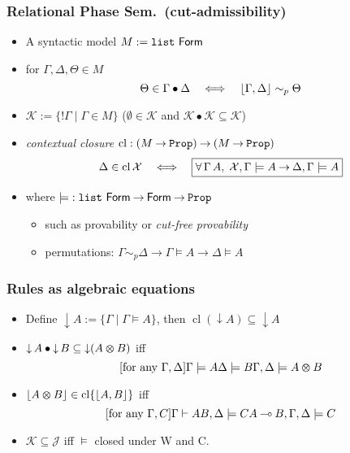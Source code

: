 \documentclass[xcolor=pdftex,graphicx=pdftex,12pt]{beamer}
\renewcommand\frule[1]{\ensuremath{\langle#1\rangle}}
\newcommand{\coq}[1]{\ensuremath{\mathalpha{\mathtt{#1}}}}
\newcommand{\cfun}{\mathbin{\rightarrow}}
\newcommand{\Prop}{\coq{Prop}}
\newcommand{\cdef}{\mathrel{\mathtt{:=}}}
\renewcommand{\iff}{\mathrel\Longleftrightarrow}
\newcommand{\seq}{\mathrel\vdash}
\newcommand{\ltime}{\mathbin{\varotimes}}
\newcommand{\limp}{\mathbin{\multimap}}
\newcommand{\lbang}{\mathop{!}}
\newcommand{\cperm}{\mathrel{\sim_p}}
\newcommand{\cl}{\mathop{\mathrm{cl}}}
\newcommand{\mmult}{\mathbin{\bullet}}
\newcommand{\set}[1]{\mathcal{#1}}
\newcommand{\pable}{\mathrel{\models}}
\begin{document}
\begin{frame}

\frametitle{Relational Phase Sem.\ (cut-admissibility)}


\begin{itemize}
\item A syntactic model  $M\cdef \coq{list}~\mathsf{Form}$
\item for $\Gamma,\Delta,\Theta\in M$
$$\Theta\in \Gamma\mmult \Delta \quad\iff\quad\ulist{\Gamma,\Delta}\cperm\Theta$$
\item $\set K\cdef \{\lbang\Gamma\mid\Gamma\in M\}$ ($\emptyset\in\set K$ and $\set K\mmult\set K\subseteq\set K$)
\item \emph{contextual closure}  $\cl: (M\cfun\Prop)\cfun (M\cfun\Prop)$ 
$$\Delta\in\cl\set X\quad\iff\quad \fbox{$\forall\,\Gamma\,A,\;\set X,\Gamma\pable A\cfun \Delta,\Gamma\pable A$}$$ 
\item where ${\pable}:\coq{list}~\mathsf{Form}\cfun\mathsf{Form}\cfun\Prop$
  \begin{itemize}
  \item such as provability or \emph{cut-free provability}
  \item permutations: $\Gamma\cperm\Delta\cfun \Gamma\pable A\cfun \Delta\pable A$
  \end{itemize}
\end{itemize}

\end{frame}

\newcommand{\dc}{\mathop{\downarrow}}
\renewcommand\frule[1]{#1}


\begin{frame}

\frametitle{Rules as algebraic equations}

\begin{itemize}

\item Define $\dc A\cdef \{\Gamma\mid \Gamma\pable A\}$, then $\cl(\dc A)\subseteq \dc A$ 
\item $\dc A\mmult\dc B\subseteq \dc(A\ltime B)$ iff 
$$
\infer2[\text{for any $\Gamma,\Delta$}]   {\Gamma \pable A}{\Delta \pable B}
                      {\Gamma, \Delta \pable A \ltime B}$$
\item $\ulist{A\ltime B}\in\cl\{\ulist{A,B}\}$ iff
$$
 \infer2[\text{for any $\Gamma,C$}]    {\Gamma \seq A}{B,\Delta \pable C}
                      {A \limp B,\Gamma, \Delta\pable C}$$
\item $\set K\subseteq\set J$ iff $\pable$ closed under \frule W and \frule C.
\end{itemize}

\end{frame}
\end{document}
